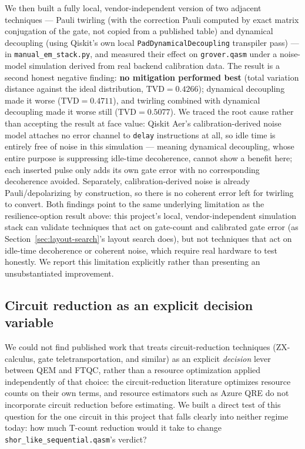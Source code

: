 \documentclass[9pt,twocolumn]{extarticle}
\begin{document}
We then built a fully local, vendor-independent version of two adjacent
techniques --- Pauli twirling (with the correction Pauli computed by exact
matrix conjugation of the gate, not copied from a published table) and
dynamical decoupling (using Qiskit's own local \texttt{PadDynamicalDecoupling}
transpiler pass) --- in \texttt{manual\_em\_stack.py}, and measured their
effect on \texttt{grover.qasm} under a noise-model simulation derived from
real backend calibration data. The result is a second honest negative
finding: \textbf{no mitigation performed best} (total variation distance
against the ideal distribution, $\mathrm{TVD}=0.4266$); dynamical decoupling
made it worse ($\mathrm{TVD}=0.4711$), and twirling combined with dynamical
decoupling made it worse still ($\mathrm{TVD}=0.5077$). We traced the root
cause rather than accepting the result at face value: Qiskit Aer's
calibration-derived noise model attaches no error channel to \texttt{delay}
instructions at all, so idle time is entirely free of noise in this
simulation --- meaning dynamical decoupling, whose entire purpose is
suppressing idle-time decoherence, cannot show a benefit here; each inserted
pulse only adds its own gate error with no corresponding decoherence
avoided. Separately, calibration-derived noise is already Pauli/depolarizing
by construction, so there is no coherent error left for twirling to convert.
Both findings point to the same underlying limitation as the resilience-option
result above: this project's local, vendor-independent simulation stack can
validate techniques that act on gate-count and calibrated gate error (as
Section~\ref{sec:layout-search}'s layout search does), but not techniques
that act on idle-time decoherence or coherent noise, which require real
hardware to test honestly. We report this limitation explicitly rather than
presenting an unsubstantiated improvement.

\subsection{Circuit reduction as an explicit decision variable}
\label{sec:reduction-sensitivity}
We could not find published work that treats circuit-reduction techniques
(ZX-calculus, gate teletransportation, and similar) as an explicit
\emph{decision} lever between QEM and FTQC, rather than a resource
optimization applied independently of that choice: the circuit-reduction
literature optimizes resource counts on their own terms, and resource
estimators such as Azure QRE do not incorporate circuit reduction before
estimating. We built a direct test of this question for the one circuit
in this project that falls clearly into neither regime today: how much
T-count reduction would it take to change \texttt{shor\_like\_sequential.qasm}'s
verdict?
\end{document}
